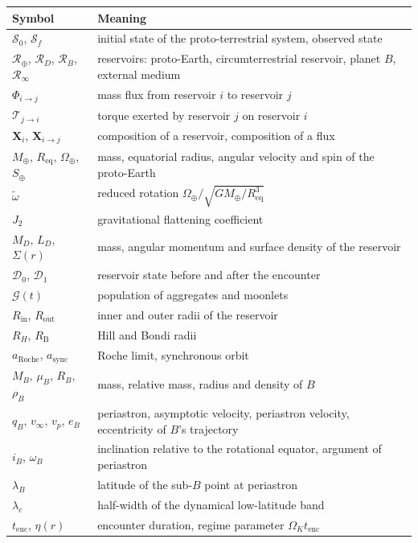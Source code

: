 \documentclass[11pt,a4paper,openany]{report}
\newcommand{\Mt}{M_{\oplus}}
\newcommand{\Req}{R_{\mathrm{eq}}}
\newcommand{\aR}{a_{\mathrm{Roche}}}
\newcommand{\RT}{\mathcal{R}_{\oplus}}
\newcommand{\RD}{\mathcal{R}_{D}}
\newcommand{\RB}{\mathcal{R}_{B}}
\newcommand{\Rinf}{\mathcal{R}_{\infty}}
\begin{document}
\small
\begin{longtable}{>{\raggedright\arraybackslash}p{3.2cm}>{\raggedright\arraybackslash}p{11.6cm}}
\toprule
\textbf{Symbol} & \textbf{Meaning} \\
\midrule
\endhead
$\mathcal{S}_0$, $\mathcal{S}_f$ & initial state of the proto-terrestrial system, observed state \\
$\RT$, $\RD$, $\RB$, $\Rinf$ & reservoirs: proto-Earth, circumterrestrial reservoir, planet $B$, external medium \\
$\Phi_{i\to j}$ & mass flux from reservoir $i$ to reservoir $j$ \\
$\boldsymbol{\mathcal{T}}_{j\to i}$ & torque exerted by reservoir $j$ on reservoir $i$ \\
$\mathbf{X}_i$, $\mathbf{X}_{i\to j}$ & composition of a reservoir, composition of a flux \\
$\Mt$, $\Req$, $\Omega_\oplus$, $S_\oplus$ & mass, equatorial radius, angular velocity and spin of the proto-Earth \\
$\tilde\omega$ & reduced rotation $\Omega_\oplus/\sqrt{G\Mt/\Req^3}$ \\
$J_2$ & gravitational flattening coefficient \\
$M_D$, $L_D$, $\Sigma(r)$ & mass, angular momentum and surface density of the reservoir \\
$\mathcal{D}_0$, $\mathcal{D}_1$ & reservoir state before and after the encounter \\
$\mathcal{G}(t)$ & population of aggregates and moonlets \\
$R_{\mathrm{in}}$, $R_{\mathrm{out}}$ & inner and outer radii of the reservoir \\
$R_H$, $R_{\mathrm{B}}$ & Hill and Bondi radii \\
$\aR$, $a_{\mathrm{sync}}$ & Roche limit, synchronous orbit \\
$M_B$, $\mu_B$, $R_B$, $\rho_B$ & mass, relative mass, radius and density of $B$ \\
$q_B$, $v_\infty$, $v_p$, $e_B$ & periastron, asymptotic velocity, periastron velocity, eccentricity of $B$'s trajectory \\
$i_B$, $\omega_B$ & inclination relative to the rotational equator, argument of periastron \\
$\lambda_B$ & latitude of the sub-$B$ point at periastron \\
$\lambda_c$ & half-width of the dynamical low-latitude band \\
$t_{\mathrm{enc}}$, $\eta(r)$ & encounter duration, regime parameter $\Omega_Kt_{\mathrm{enc}}$ \\

\end{longtable}
\end{document}
